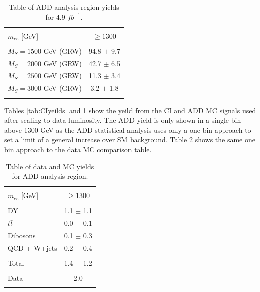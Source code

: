 	\begin{table}[h!]
	\centering %
	\begin{tabular}{l c} %
	\hline\hline \\[-2ex] %
	$m_{ee}$ [GeV] & $\geq 1300$ \\  [0.2ex]
	\hline  \\[-2ex] %
	$M_{S} = 1500$ GeV (GRW) & 94.8 $\pm$ 9.7 \\ 
	$M_{S} = 2000$ GeV (GRW) & 42.7 $\pm$ 6.5 \\ 
	$M_{S} = 2500$ GeV (GRW) & 11.3 $\pm$ 3.4 \\ 
	$M_{S} = 3000$ GeV (GRW) & 3.2 $\pm$ 1.8 \\ 
	\hline\hline  \\ %
	\end{tabular}
	\caption{Table of ADD analysis region yields for 4.9 $fb^{-1}$.} %
	\label{tab:ADDyeilds}
	\end{table}


	Tables \ref{tab:CIyeilds} and \ref{tab:ADDyeilds} show the yeild from the CI and ADD MC signals used after scaling to data luminosity. The ADD yield is only shown in a single bin above 1300 GeV as the ADD statistical analysis uses only a one bin approach to set a limit of a general increase over SM background. Table \ref{tab:dataMCADDyeilds} shows the same one bin approach to the data MC comparison table.

	\begin{table}[h!]
	\centering %
	\begin{tabular}{l c} %
	\hline\hline \\[-2ex] %
	$m_{ee}$ [GeV] & $\geq 1300$ \\  [0.2ex]
	\hline  \\[-2ex] %
	DY & 1.1 $\pm$ 1.1 \\ 
	$t\bar{t}$ & 0.0 $\pm$ 0.1 \\ 
	Dibosons & 0.1 $\pm$ 0.3 \\ 
	QCD + W+jets & 0.2 $\pm$ 0.4 \\ 
	\hline  \\[-2ex] %
	Total & 1.4 $\pm$ 1.2 \\ 
	\hline  \\[-2ex] %
	Data & 2.0 \\ 
	\hline\hline  \\ %
	\end{tabular}
	\caption{Table of data and MC yields for ADD analysis region.} %
	\label{tab:dataMCADDyeilds}
	\end{table}


